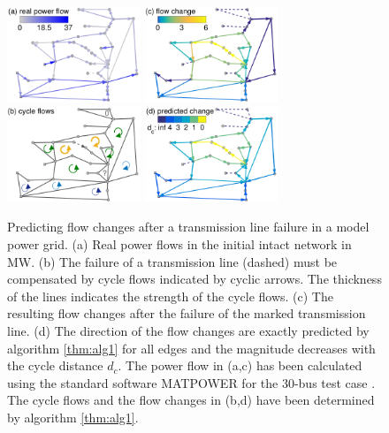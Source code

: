 \documentclass[10pt,aps,pra,twocolumn,superscriptaddress]{revtex4-1}
\begin{document}
\begin{figure}[tb]
\includegraphics[width=4cm]{pics/case30c_flow2.pdf}
\includegraphics[width=4cm]{pics/case30c_fchange_num2.pdf} \\ [5mm]
\includegraphics[width=4cm]{pics/case30c_cycles2.pdf}
\includegraphics[width=4cm]{pics/case30c_fchange_pred2.pdf}
\caption{
\label{fig:case30}
Predicting flow changes after a transmission line failure in a model power grid.
(a) Real power flows in the initial intact network in MW.
(b) The failure of a transmission line (dashed) must be compensated by cycle flows indicated by
cyclic arrows. The thickness of the lines indicates the strength of the cycle flows. 
(c) The resulting flow changes after the failure of the marked transmission line.
(d) The direction of the flow changes are exactly predicted by algorithm \ref{thm:alg1}
for all edges and the magnitude decreases with the cycle distance $d_c$.
The power flow in (a,c) has been calculated using the standard software 
MATPOWER for the 30-bus test case \cite{MATPOWER}.
The cycle flows and the flow changes in (b,d) have been determined by algorithm 
\ref{thm:alg1}.
}
\end{figure}
\end{document}
